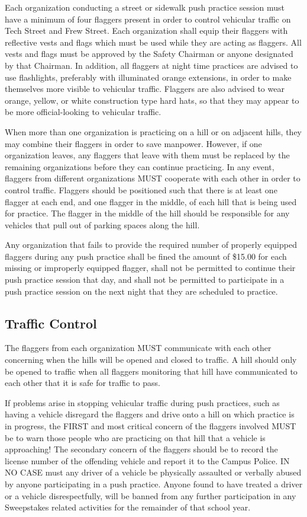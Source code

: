 	Each organization conducting a street or sidewalk push practice session must
	have a minimum of four flaggers present in order to control vehicular traffic
	on Tech Street and Frew Street. Each organization shall equip their flaggers
	with reflective vests and flags which must be used while they are acting as
	flaggers. All vests and flags must be approved by the Safety Chairman or anyone
	designated by that Chairman. In addition, all flaggers at night time practices
	are advised to use flashlights, preferably with illuminated orange extensions,
	in order to make themselves more visible to vehicular traffic. Flaggers are
	also advised to wear orange, yellow, or white construction type hard hats, so
	that they may appear to be more official-looking to vehicular traffic.

	When more than one organization is practicing on a hill or on adjacent hills,
	they may combine their flaggers in order to save manpower. However, if one
	organization leaves, any flaggers that leave with them must be replaced by the
	remaining organizations before they can continue practicing. In any event,
	flaggers from different organizations MUST cooperate with each other in order
	to control traffic. Flaggers should be positioned such that there is at least
	one flagger at each end, and one flagger in the middle, of each hill that is
	being used for practice. The flagger in the middle of the hill should be
	responsible for any vehicles that pull out of parking spaces along the hill.

	Any organization that fails to provide the required number of properly equipped
	flaggers during any push practice shall be fined the amount of \$15.00 for each
	missing or improperly equipped flagger, shall not be permitted to continue
	their push practice session that day, and shall not be permitted to participate
	in a push practice session on the next night that they are scheduled to
	practice.

\subsection{Traffic Control}

	The flaggers from each organization MUST communicate with each other concerning
	when the hills will be opened and closed to traffic. A hill should only be
	opened to traffic when all flaggers monitoring that hill have communicated to
	each other that it is safe for traffic to pass.

	If problems arise in stopping vehicular traffic during push practices, such as
	having a vehicle disregard the flaggers and drive onto a hill on which practice
	is in progress, the FIRST and most critical concern of the flaggers involved
	MUST be to warn those people who are practicing on that hill that a vehicle is
	approaching! The secondary concern of the flaggers should be to record the
	license number of the offending vehicle and report it to the Campus Police. IN
	NO CASE must any driver of a vehicle be physically assaulted or verbally abused
	by anyone participating in a push practice. Anyone found to have treated a
	driver or a vehicle disrespectfully, will be banned from any further
	participation in any Sweepstakes related activities for the remainder of that
	school year.

